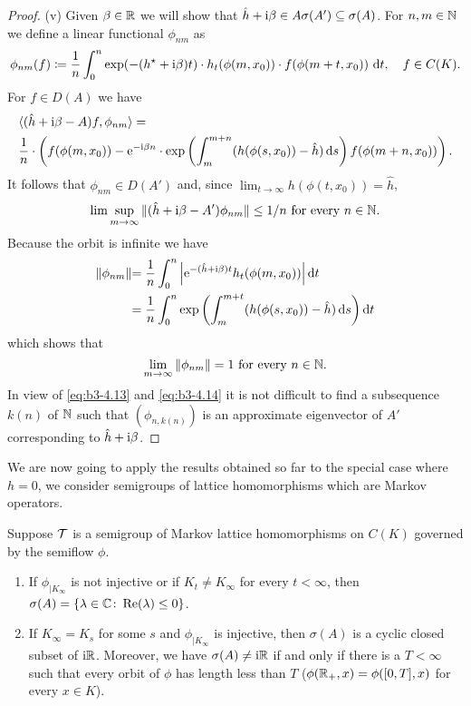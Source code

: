 \begin{proof}
    (v) Given $\beta \in \mathbb{R}$ we will show that $\hat{h} + \mathrm{i}\beta \in A\sigma(A') \subseteq \sigma(A)$.
    For $n,m \in \mathbb{N}$ we define a linear functional $\phi_{nm}$ as 
\[  
		\phi_{nm}(f) \coloneq \frac{1}{n}\int_{0}^{n} \exp(-(h^{\star}+\mathrm{i}\beta )t)\cdot h_{t}(\phi(m,x_{0}))\cdot f(\phi(m+t,x_{0})) \text{ d}t, \quad f\in C(K).
\]
For $f \in D(A)$ we have 
	\begin{align*}
	&\langle(\hat{h}+\im\beta -A)f,\phi_{nm}\rangle = \\
	&  \frac{1}{n}\cdot\left(f(\phi(m,x_{0})) - \mathrm{e}^{-\im\beta  n}\cdot %
	\exp\left(\int_{m}^{m+n} (h(\phi(s,x_{0}))-\hat{h})\ds \right)f(\phi(m+n,x_{0}))\right).
	\end{align*}
It follows that $\phi_{nm} \in D(A')$ and, since $\lim_{t\to\infty} h(\phi(t,x_{0})) = \hat{h}$,
\begin{equation}\label{eq:b3-4.13}
	\lim \sup_{m\to\infty} \|(\hat{h}+\mathrm{i}\beta -A')\phi_{nm}\| \leq 1/n \text{ for every } n \in \mathbb{N}.
\end{equation}
Because the orbit is infinite we have
	\begin{align*}
	\|\phi_{nm}\| & {= \frac{1}{n}\int_{0}^{n} \left|\mathrm{e}^{-(\hat{h}+\mathrm{i}\beta )t} h_{t}(\phi(m,x_{0}))\right| \mathop{}\!\mathrm{d}{t}} \\
	& {= \frac{1}{n}\int_{0}^{n} \exp\left(\int_{m}^{m+t} (h(\phi(s,x_{0}))-\hat{h})\mathop{}\!\mathrm{d}{s} \right)\mathop{}\!\mathrm{d}{t}}
	\end{align*}
which shows that
\begin{equation}\label{eq:b3-4.14}
	\lim_{m\to\infty} \|\phi_{nm}\| = 1 \text{ for every } n \in \mathbb{N}.
\end{equation}
In view of \eqref{eq:b3-4.13} and \eqref{eq:b3-4.14} it is not difficult to find a subsequence $k(n)$ of $\mathbb{N}$ such that $(\phi_{n,k(n)})$ is an approximate eigenvector of $A'$ corresponding to $\hat{h} + \mathrm{i}\beta$.
\end{proof}
We are now going to apply the results obtained so far to the special case where $h = 0$, \ie we consider semigroups of lattice homomorphisms which are Markov operators.
\begin{theorem}\label{thm:b3-4.9}
	Suppose $\mathcal{T}$ is a semigroup of Markov lattice homomorphisms on $C(K)$ governed by the semiflow $\phi$.
	\begin{enumerate}[\upshape (i)]
		\item 
		If $\phi_{|K_{\infty}}$ is not injective or if $K_{t} \neq K_{\infty}$ for every $t < \infty$, then $\sigma(A) = \{\lambda \in \mathbb{C} \colon \mathop{}\!\mathrm{Re}(\lambda) \leq 0\}$.
		
		\item 
		If $K_{\infty} = K_{s}$ for some $s$ and $\phi_{|K_{\infty}}$ is injective, then $\sigma(A)$ is a cyclic closed subset of $\mathrm{i} \mathbb{R}$.
		Moreover, we have $\sigma(A) \neq \mathrm{i}\mathbb{R}$ if and only if there is a $T < \infty$ such that every orbit of $\phi$ has length less than $T$ (\ie $\phi(\mathbb{R}_{+},x) = \phi([0,T],x)$ for every $x \in K$).
	\end{enumerate}
\end{theorem}
